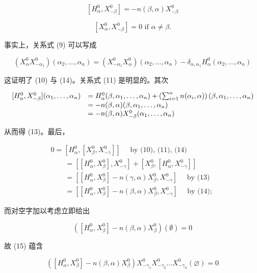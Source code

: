 \[
[ H _ {\alpha} ^ {0}, X _ {- \beta} ^ {0} ] = - n (\beta , \alpha) X _ {- \beta} ^ {0}\tag{13}
\]

\[
[ X _ {\alpha} ^ {0}, X _ {- \beta} ^ {0} ] = 0 \text {   if   } \alpha \neq \beta .\tag{14}
\]

事实上，关系式 (9) 可以写成

\[
(X _ {\alpha} ^ {0} X _ {- \alpha_ {1}} ^ {0}) (\alpha_ {2}, \ldots , \alpha_ {n}) = (X _ {- \alpha_ {1}} ^ {0} X _ {\alpha} ^ {0}) (\alpha_ {2}, \ldots , \alpha_ {n}) - \delta_ {\alpha , \alpha_ {1}} H _ {\alpha} ^ {0} (\alpha_ {2}, \ldots , \alpha_ {n})
\]

这证明了 (10) 与 (14)。关系式 (11) 是明显的。其次

\[
\begin{array}{r l} [ H _ {\alpha} ^ {0}, X _ {- \beta} ^ {0} ] (\alpha_ {1}, \ldots , \alpha_ {n}) & = H _ {\alpha} ^ {0} (\beta , \alpha_ {1}, \ldots , \alpha_ {n}) + \left(\sum_ {i = 1} ^ {n} n (\alpha_ {i}, \alpha)\right) (\beta , \alpha_ {1}, \ldots , \alpha_ {n}) \\ & = - n (\beta , \alpha) (\beta , \alpha_ {1}, \ldots , \alpha_ {n}) \\ & = - n (\beta , \alpha) X _ {- \beta} ^ {0} (\alpha_ {1}, \ldots , \alpha_ {n}) \end{array}
\]

从而得 (13)。最后，

\[
\begin{array}{l} 0 = [ H _ {\alpha} ^ {0}, [ X _ {\beta} ^ {0}, X _ {- \gamma} ^ {0} ] ] \quad \text { by (10), (11), (14)} \\ \qquad = [ [ H _ {\alpha} ^ {0}, X _ {\beta} ^ {0} ], X _ {- \gamma} ^ {0} ] + [ X _ {\beta} ^ {0}, [ H _ {\alpha} ^ {0}, X _ {- \gamma} ^ {0} ] ] \\ \qquad = [ [ H _ {\alpha} ^ {0}, X _ {\beta} ^ {0} ] - n (\gamma , \alpha) X _ {\beta} ^ {0}, X _ {- \gamma} ^ {0} ] \quad \text { by (13)} \\ \qquad = [ [ H _ {\alpha} ^ {0}, X _ {\beta} ^ {0} ] - n (\beta , \alpha) X _ {\beta} ^ {0}, X _ {- \gamma} ^ {0} ] \quad \text { by (14); } \end{array}\tag{15}
\]

而对空字加以考虑立即给出

\[
([ H _ {\alpha} ^ {0}, X _ {\beta} ^ {0} ] - n (\beta , \alpha) X _ {\beta} ^ {0}) (\emptyset) = 0
\]

故 (15) 蕴含

\[
\left(\left[ H _ {\alpha} ^ {0}, X _ {\beta} ^ {0} \right] - n (\beta , \alpha) X _ {\beta} ^ {0}\right) X _ {- \gamma_ {1}} ^ {0} X _ {- \gamma_ {2}} ^ {0} \dots X _ {- \gamma_ {n}} ^ {0} (\varnothing) = 0
\]

